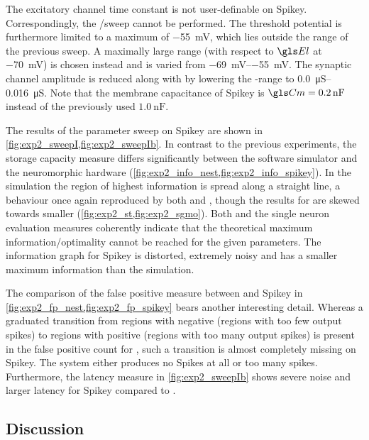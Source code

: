 The excitatory channel time constant \TauE is not user-definable on Spikey. Correspondingly, the \Gl/\TauE sweep cannot be performed. The threshold potential \ETh is furthermore limited to a maximum of \SI{-55}{\milli\volt}, which lies outside the range of the previous sweep. A maximally large range (with respect to $\El$ at \SI{-70}{\milli\volt}) is chosen instead and \ETh is varied from \SIrange{-69}{-55}{\milli\volt}. The synaptic channel amplitude is reduced along with \ETh by lowering the \wsyn-range to \SIrange{0.0}{0.016}{\micro\siemens}. Note that the membrane capacitance of Spikey is $\Cm = \SI{0.2}{\nano\farad}$ instead of the previously used $\SI{1.0}{\nano\farad}$.

The results of the parameter sweep on Spikey are shown in \cref{fig:exp2_sweepI,fig:exp2_sweepIb}. In contrast to the previous experiments, the storage capacity measure differs significantly between the software simulator \NEST and the neuromorphic hardware (\cref{fig:exp2_info_nest,fig:exp2_info_spikey}). In the \NEST simulation the region of highest information is spread along a straight line, a behaviour once again reproduced by both \STII and \SGMO, though the results for \SGMO are skewed towards smaller \wsyn (\cref{fig:exp2_st,fig:exp2_sgmo}). Both \NEST and the single neuron evaluation measures coherently indicate that the theoretical maximum information/optimality cannot be reached for the given parameters. The information graph for Spikey is distorted, extremely noisy and has a smaller maximum information than the \NEST simulation.

The comparison of the false positive measure between \NEST and Spikey in \cref{fig:exp2_fp_nest,fig:exp2_fp_spikey} bears another interesting detail. Whereas a graduated transition from regions with negative \nFP (regions with too few output spikes) to regions with positive \nFP (regions with too many output spikes) is present in the false positive count for \NEST, such a transition is almost completely missing on Spikey. The system either produces no Spikes at all or too many spikes. Furthermore, the latency measure in \cref{fig:exp2_sweepIb} shows severe noise and larger latency for Spikey compared to \NEST.


\subsection{Discussion}
\label{sec:neuron_parameter_sweep_discussion}

